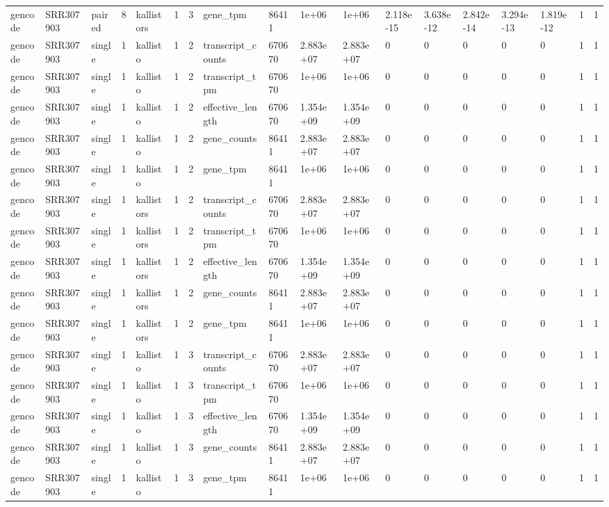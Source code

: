 \begin{tabular}{llllllllllllllllll}
gencode & SRR307903 & paired & 8 & kallistors & 1 & 3 & gene\_tpm & 86411 & 1e+06 & 1e+06 & 2.118e-15 & 3.638e-12 & 2.842e-14 & 3.294e-13 & 1.819e-12 & 1 & 1 \\
gencode & SRR307903 & single & 1 & kallisto & 1 & 2 & transcript\_counts & 670670 & 2.883e+07 & 2.883e+07 & 0 & 0 & 0 & 0 & 0 & 1 & 1 \\
gencode & SRR307903 & single & 1 & kallisto & 1 & 2 & transcript\_tpm & 670670 & 1e+06 & 1e+06 & 0 & 0 & 0 & 0 & 0 & 1 & 1 \\
gencode & SRR307903 & single & 1 & kallisto & 1 & 2 & effective\_length & 670670 & 1.354e+09 & 1.354e+09 & 0 & 0 & 0 & 0 & 0 & 1 & 1 \\
gencode & SRR307903 & single & 1 & kallisto & 1 & 2 & gene\_counts & 86411 & 2.883e+07 & 2.883e+07 & 0 & 0 & 0 & 0 & 0 & 1 & 1 \\
gencode & SRR307903 & single & 1 & kallisto & 1 & 2 & gene\_tpm & 86411 & 1e+06 & 1e+06 & 0 & 0 & 0 & 0 & 0 & 1 & 1 \\
gencode & SRR307903 & single & 1 & kallistors & 1 & 2 & transcript\_counts & 670670 & 2.883e+07 & 2.883e+07 & 0 & 0 & 0 & 0 & 0 & 1 & 1 \\
gencode & SRR307903 & single & 1 & kallistors & 1 & 2 & transcript\_tpm & 670670 & 1e+06 & 1e+06 & 0 & 0 & 0 & 0 & 0 & 1 & 1 \\
gencode & SRR307903 & single & 1 & kallistors & 1 & 2 & effective\_length & 670670 & 1.354e+09 & 1.354e+09 & 0 & 0 & 0 & 0 & 0 & 1 & 1 \\
gencode & SRR307903 & single & 1 & kallistors & 1 & 2 & gene\_counts & 86411 & 2.883e+07 & 2.883e+07 & 0 & 0 & 0 & 0 & 0 & 1 & 1 \\
gencode & SRR307903 & single & 1 & kallistors & 1 & 2 & gene\_tpm & 86411 & 1e+06 & 1e+06 & 0 & 0 & 0 & 0 & 0 & 1 & 1 \\
gencode & SRR307903 & single & 1 & kallisto & 1 & 3 & transcript\_counts & 670670 & 2.883e+07 & 2.883e+07 & 0 & 0 & 0 & 0 & 0 & 1 & 1 \\
gencode & SRR307903 & single & 1 & kallisto & 1 & 3 & transcript\_tpm & 670670 & 1e+06 & 1e+06 & 0 & 0 & 0 & 0 & 0 & 1 & 1 \\
gencode & SRR307903 & single & 1 & kallisto & 1 & 3 & effective\_length & 670670 & 1.354e+09 & 1.354e+09 & 0 & 0 & 0 & 0 & 0 & 1 & 1 \\
gencode & SRR307903 & single & 1 & kallisto & 1 & 3 & gene\_counts & 86411 & 2.883e+07 & 2.883e+07 & 0 & 0 & 0 & 0 & 0 & 1 & 1 \\
gencode & SRR307903 & single & 1 & kallisto & 1 & 3 & gene\_tpm & 86411 & 1e+06 & 1e+06 & 0 & 0 & 0 & 0 & 0 & 1 & 1 \\

\end{tabular}
